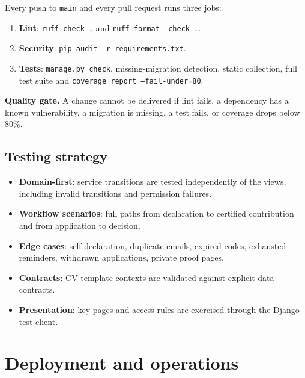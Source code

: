 \documentclass[11pt,a4paper]{article}
\begin{document}
Every push to \texttt{main} and every pull request runs three jobs:

\begin{enumerate}[leftmargin=1.8em,itemsep=3pt]
  \item \textbf{Lint}: \texttt{ruff check .} and
        \texttt{ruff format --check .}.
  \item \textbf{Security}: \texttt{pip-audit -r requirements.txt}.
  \item \textbf{Tests}: \texttt{manage.py check}, missing-migration
        detection, static collection, full test suite and
        \texttt{coverage report --fail-under=80}.
\end{enumerate}

\begin{keybox}
\textbf{Quality gate.} A change cannot be delivered if lint fails, a dependency
has a known vulnerability, a migration is missing, a test fails, or coverage
drops below 80\%.
\end{keybox}

\subsection{Testing strategy}

\begin{itemize}[leftmargin=1.4em,itemsep=3pt]
  \item \textbf{Domain-first}: service transitions are tested independently of
        the views, including invalid transitions and permission failures.
  \item \textbf{Workflow scenarios}: full paths from declaration to certified
        contribution and from application to decision.
  \item \textbf{Edge cases}: self-declaration, duplicate emails, expired codes,
        exhausted reminders, withdrawn applications, private proof pages.
  \item \textbf{Contracts}: CV template contexts are validated against explicit
        data contracts.
  \item \textbf{Presentation}: key pages and access rules are exercised through
        the Django test client.
\end{itemize}

\section{Deployment and operations}
\label{sec:ops}
\end{document}
